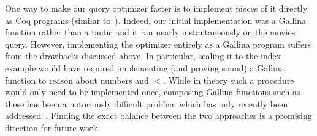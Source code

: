 \documentclass[preprint]{sigplanconf}
\begin{document}
One way to make our query optimizer faster is to implement pieces of it directly as Coq programs (similar to~\cite{coqdb}).
Indeed, our initial implementation was a Gallina function rather than a tactic and it ran nearly instantaneously on the movies query.
However, implementing the optimizer entirely as a Gallina program suffers from the drawbacks discussed above.
In particular, scaling it to the index example would have required implementing (and proving sound) a Gallina function to reason about numbers and $<$.
While in theory such a procedure would only need to be implemented once, composing Gallina functions such as these has been a notoriously difficult problem which has only recently been addressed~\cite{malecha2014mirror-shard}.
Finding the exact balance between the two approaches is a promising direction for future work.

%
%


\end{document}
